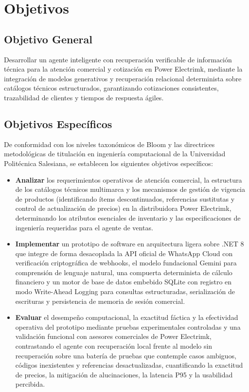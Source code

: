 \section{Objetivos}

\subsection{Objetivo General}
Desarrollar un agente inteligente con recuperación verificable de información técnica para la atención comercial y cotización en Power Electrimk, mediante la integración de modelos generativos y recuperación relacional determinista sobre catálogos técnicos estructurados, garantizando cotizaciones consistentes, trazabilidad de clientes y tiempos de respuesta ágiles.

\subsection{Objetivos Específicos}

De conformidad con los niveles taxonómicos de Bloom y las directrices metodológicas de titulación en ingeniería computacional de la Universidad Politécnica Salesiana, se establecen los siguientes objetivos específicos:

\begin{itemize}
    \item \textbf{Analizar} los requerimientos operativos de atención comercial, la estructura de los catálogos técnicos multimarca y los mecanismos de gestión de vigencia de productos (identificando ítems descontinuados, referencias sustitutas y control de actualización de precios) en la distribuidora Power Electrimk, determinando los atributos esenciales de inventario y las especificaciones de ingeniería requeridas para el agente de ventas.
    \item \textbf{Implementar} un prototipo de software en arquitectura ligera sobre .NET 8 que integre de forma desacoplada la API oficial de WhatsApp Cloud con verificación criptográfica de webhooks, el modelo fundacional Gemini para comprensión de lenguaje natural, una compuerta determinista de cálculo financiero y un motor de base de datos embebido SQLite con registro en modo Write-Ahead Logging para consultas estructuradas, serialización de escrituras y persistencia de memoria de sesión comercial.
    \item \textbf{Evaluar} el desempeño computacional, la exactitud fáctica y la efectividad operativa del prototipo mediante pruebas experimentales controladas y una validación funcional con asesores comerciales de Power Electrimk, contrastando el agente con recuperación local frente al modelo sin recuperación sobre una batería de pruebas que contemple casos ambiguos, códigos inexistentes y referencias desactualizadas, cuantificando la exactitud de precios, la mitigación de alucinaciones, la latencia P95 y la usabilidad percibida.
\end{itemize}
